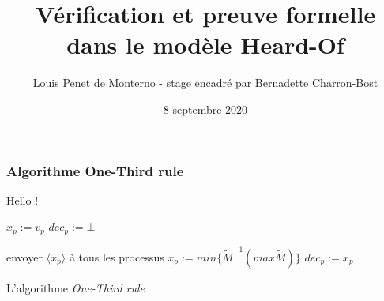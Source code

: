\documentclass{beamer}
\title{Vérification et preuve formelle dans le modèle Heard-Of}
\date{8 septembre 2020}
\author{Louis Penet de Monterno - stage encadré par Bernadette Charron-Bost}
\begin{document}
\frame{\titlepage}

\begin{frame}
\frametitle{Algorithme One-Third rule}

Hello !

\begin{algorithm}[htb]
\begin{distribalgo}[1]
\BLANK
{}
	\STATE $x_p := v_p$ 
	\STATE $dec_p := \bot$ 
\ENDINDENT

\BLANK

		\STATE envoyer $\langle x_p \rangle$ à tous les processus
	\ENDINDENT
	\BLANK
			\STATE $x_p := min \{\widetilde{M}^{-1} (max \widetilde{M})\}$ 
				\STATE $dec_p := x_p$ 
			\ENDIF
		\ENDIF
	\ENDINDENT
\ENDINDENT \BLANK


\caption{L'algorithme {\em One-Third rule}} \label{algo:R}
\end{distribalgo}

\end{algorithm}


\end{frame}
\end{document}
